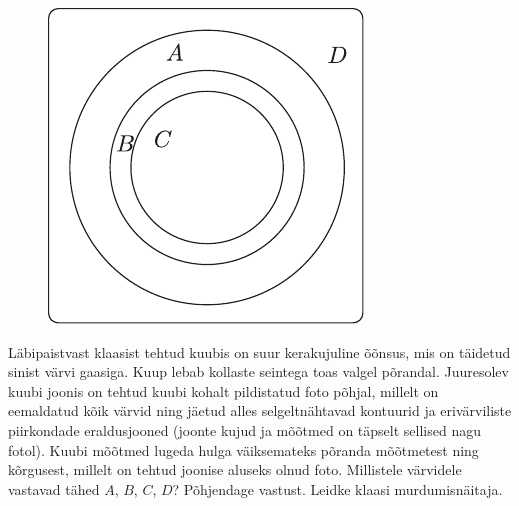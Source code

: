 \documentclass[10pt]{article}
\begin{document}
{%

\begin{figure}
	\begin{center}
		\vspace{-20pt}
		\includegraphics[width=0.95\linewidth]{2007-v3g-08-yl}
	\end{center}
\end{figure}
Läbipaistvast klaasist tehtud kuubis on suur kerakujuline õõnsus, mis on täidetud sinist värvi gaasiga. Kuup lebab kollaste seintega toas valgel põrandal. Juuresolev kuubi joonis on tehtud kuubi kohalt pildistatud foto põhjal, millelt on eemaldatud kõik värvid ning jäetud alles selgeltnähtavad kontuurid ja erivärviliste piirkondade eraldusjooned (joonte kujud ja mõõtmed on täpselt sellised nagu fotol). Kuubi mõõtmed lugeda hulga väiksemateks põranda mõõtmetest ning kõrgusest, millelt on tehtud joonise aluseks olnud foto. Millistele värvidele vastavad tähed $A$, $B$, $C$, $D$? Põhjendage vastust. Leidke klaasi murdumisnäitaja.
\probend
\newpage

\bigskip


}
\end{document}
